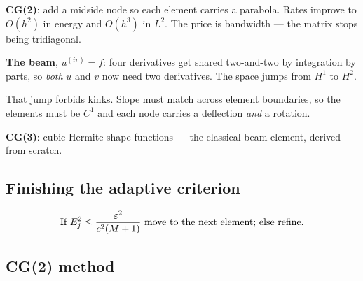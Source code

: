 

\begin{roadmap}[Lectures 10--11]
\begin{roadlist}
\item \textbf{CG(2)}: add a midside node so each element carries a parabola.
  Rates improve to $O(h^{2})$ in energy and $O(h^{3})$ in $L^{2}$. The price is
  bandwidth --- the matrix stops being tridiagonal.
\item \textbf{The beam}, $u^{(iv)}=f$: four derivatives get shared two-and-two
  by integration by parts, so \emph{both} $u$ and $v$ now need two derivatives.
  The space jumps from $H^{1}$ to $H^{2}$.
\item That jump forbids kinks. Slope must match across element boundaries, so
  the elements must be \textbf{$C^{1}$} and each node carries a deflection
  \emph{and} a rotation.
\item \textbf{CG(3)}: cubic Hermite shape functions --- the classical beam
  element, derived from scratch.
\end{roadlist}
\end{roadmap}

\subsection*{Finishing the adaptive criterion}

\begin{equation}\label{eq:l10adapt}
  \text{If } E_{j}^{2}\le\frac{\varepsilon^{2}}{c^{2}(M+1)}
  \text{ move to the next element; else refine.}
\end{equation}

\subsection*{CG(2) method}

